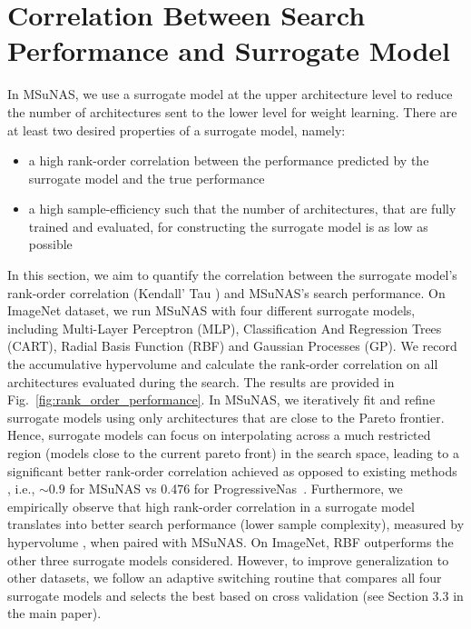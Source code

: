 \documentclass[runningheads]{llncs}
\def\ourmethod{MSuNAS}
\begin{document}
\section{Correlation Between Search Performance and Surrogate Model\label{sec:surrogate}}
In \ourmethod{}, we use a surrogate model at the upper architecture level to reduce the number of architectures sent to the lower level for weight learning. There are at least two desired properties of a surrogate model, namely:

\begin{itemize}
    \item a high rank-order correlation between the performance predicted by the surrogate model and the true performance
    \item a high sample-efficiency such that the number of architectures, that are fully trained and evaluated, for constructing the surrogate model is as low as possible
\end{itemize}

In this section, we aim to quantify the correlation between the surrogate model's rank-order correlation (Kendall' Tau \cite{kendalltau}) and \ourmethod{}'s search performance. On ImageNet dataset, we run \ourmethod{} with four different surrogate models, including Multi-Layer Perceptron (MLP), Classification And Regression Trees (CART), Radial Basis Function (RBF) and Gaussian Processes (GP). We record the accumulative hypervolume \cite{hypervolume} and calculate the rank-order correlation on all architectures evaluated during the search. The results are provided in Fig.~\ref{fig:rank_order_performance}. In \ourmethod{}, we iteratively fit and refine surrogate models using only architectures that are close to the Pareto frontier. Hence, surrogate models can focus on interpolating across a much restricted region (models close to the current pareto front) in the search space, leading to a significant better rank-order correlation achieved as opposed to existing methods \cite{PNAS,dppnet}, i.e., $\sim 0.9$ for \ourmethod{} vs 0.476 for ProgressiveNas~\cite{PNAS}. Furthermore, we empirically observe that high rank-order correlation in a surrogate model translates into better search performance (lower sample complexity), measured by hypervolume \cite{hypervolume}, when paired with \ourmethod{}. On ImageNet, RBF outperforms the other three  surrogate models considered. However, to improve generalization to other datasets, we follow an adaptive switching routine that compares all four surrogate models and selects the best based on cross validation (see Section 3.3 in the main paper).
\end{document}
